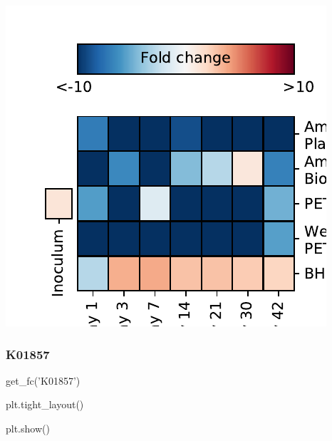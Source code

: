 \documentclass[
]{article}
\newenvironment{Shaded}{\begin{snugshade}}{\end{snugshade}}
\newcommand{\NormalTok}[1]{#1}
\newcommand{\StringTok}[1]{\textcolor[rgb]{0.31,0.60,0.02}{#1}}
\begin{document}
\includegraphics{20-6-15-PET-plastisphere-PICRUSt2_files/figure-latex/plot_fc_K00449-1.pdf}

\hypertarget{k01857-1}{%
\subsubsection{K01857}\label{k01857-1}}

\begin{Shaded}
\begin{Highlighting}[]
\NormalTok{get_fc(}\StringTok{'K01857'}\NormalTok{)}
\end{Highlighting}
\end{Shaded}

\begin{Shaded}
\begin{Highlighting}[]
\NormalTok{plt.tight_layout()}
\end{Highlighting}
\end{Shaded}

\begin{Shaded}
\begin{Highlighting}[]
\NormalTok{plt.show()}
\end{Highlighting}
\end{Shaded}
\end{document}
